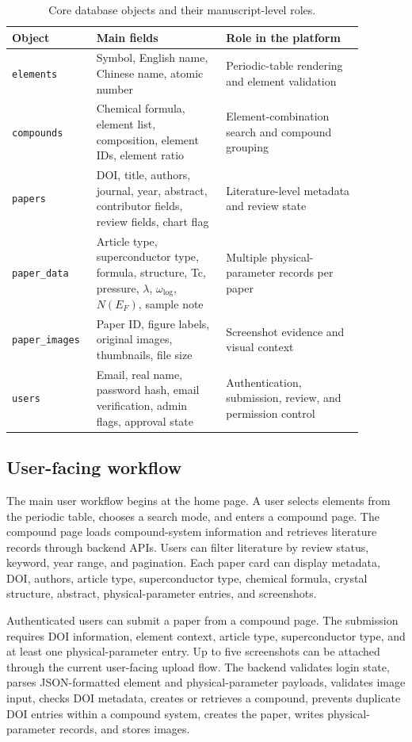 \documentclass[11pt,a4paper]{article}
\begin{document}
\begin{table}[t]
\centering
\caption{Core database objects and their manuscript-level roles.}
\label{tab:model}
\begin{tabular}{>{\raggedright\arraybackslash}p{0.18\linewidth} >{\raggedright\arraybackslash}p{0.34\linewidth} >{\raggedright\arraybackslash}p{0.36\linewidth}}
\toprule
Object & Main fields & Role in the platform \\
\midrule
\texttt{elements} & Symbol, English name, Chinese name, atomic number & Periodic-table rendering and element validation \\
\texttt{compounds} & Chemical formula, element list, composition, element IDs, element ratio & Element-combination search and compound grouping \\
\texttt{papers} & DOI, title, authors, journal, year, abstract, contributor fields, review fields, chart flag & Literature-level metadata and review state \\
\texttt{paper\_data} & Article type, superconductor type, formula, structure, Tc, pressure, $\lambda$, $\omega_{\log}$, $N(E_F)$, sample note & Multiple physical-parameter records per paper \\
\texttt{paper\_images} & Paper ID, figure labels, original images, thumbnails, file size & Screenshot evidence and visual context \\
\texttt{users} & Email, real name, password hash, email verification, admin flags, approval state & Authentication, submission, review, and permission control \\
\bottomrule
\end{tabular}
\end{table}

\subsection{User-facing workflow}

The main user workflow begins at the home page. A user selects elements from the periodic table, chooses a search mode, and enters a compound page. The compound page loads compound-system information and retrieves literature records through backend APIs. Users can filter literature by review status, keyword, year range, and pagination. Each paper card can display metadata, DOI, authors, article type, superconductor type, chemical formula, crystal structure, abstract, physical-parameter entries, and screenshots.

Authenticated users can submit a paper from a compound page. The submission requires DOI information, element context, article type, superconductor type, and at least one physical-parameter entry. Up to five screenshots can be attached through the current user-facing upload flow. The backend validates login state, parses JSON-formatted element and physical-parameter payloads, validates image input, checks DOI metadata, creates or retrieves a compound, prevents duplicate DOI entries within a compound system, creates the paper, writes physical-parameter records, and stores images.
\end{document}
